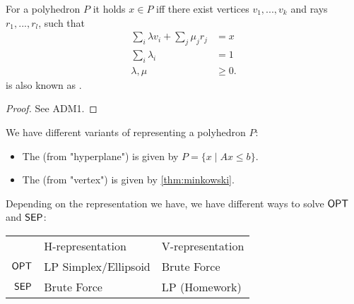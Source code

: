 \begin{theorem}[Minkowski] \label{thm:minkowski}
    For a polyhedron $P$ it holds $x \in P$ iff there exist vertices $v_1,...,v_k$
    and rays $r_1, ..., r_l$, such that
    \begin{align*}
        \sum_i \lambda v_i + \sum_j \mu_j r_j & = x     \\
        \sum_i \lambda_i                      & = 1     \\
        \lambda, \mu                          & \geq 0.
    \end{align*}
     is also known as .
\end{theorem}
\begin{proof}
    See ADM1.
\end{proof}
\begin{definition}
    We have different variants of representing a polyhedron $P$:
    \begin{itemize}
        \item The  (from "hyperplane") is given by $P=\{x \mid Ax \leq b\}$.
        \item The  (from "vertex") is given by \autoref{thm:minkowski}.
    \end{itemize}
\end{definition}
\begin{conclusion}
    Depending on the representation we have, we have different ways to solve $\mathsf{OPT}$ and $\mathsf{SEP}$:
    \\
    \begin{center}
        \begin{tabular}{rll}
                                        & H-representation                          & V-representation                   \\ \cline{2-3}
            \multicolumn{1}{r|}{$\mathsf{OPT}$} & \multicolumn{1}{l|}{LP Simplex/Ellipsoid} & \multicolumn{1}{l|}{Brute Force}   \\ \cline{2-3}
            \multicolumn{1}{r|}{$\mathsf{SEP}$} & \multicolumn{1}{l|}{Brute Force}          & \multicolumn{1}{l|}{LP (Homework)} \\ \cline{2-3}
        \end{tabular}
    \end{center}

\end{conclusion}
